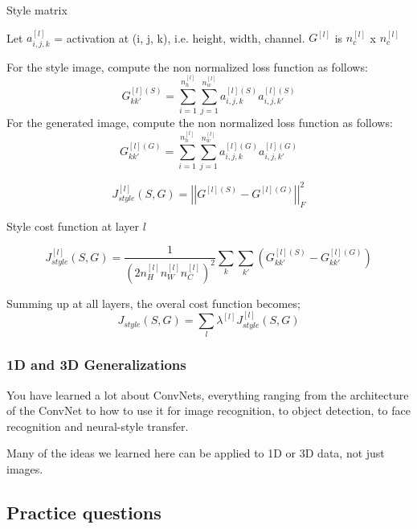 Style matrix

Let $a^{[l]}_{i,j,k}$ = activation at (i, j, k), i.e. height, width, channel. $G^{[l]}$ is $n^{[l]}_{c}$ x $n^{[l]}_{c}$

For the style image, compute the non normalized loss function as follows:
\begin{equation*}
G^{[l](S)}_{kk'} = \sum^{n^{[l]}_h}_{i=1} \sum^{n^{[l]}_{w}}_{j=1} a^{[l](S)}_{i,j,k} a^{[l](S)}_{i,j,k'}
\end{equation*}
For the generated image, compute the non normalized loss function as follows:
\begin{equation*}
G^{[l](G)}_{kk'} = \sum^{n^{[l]}_h}_{i=1} \sum^{n^{[l]}_{w}}_{j=1} a^{[l](G)}_{i,j,k} a^{[l](G)}_{i,j,k'}
\end{equation*}

\begin{equation*}
J^{[l]}_{style} (S, G) = \left|\left| G^{[l](S)} - G^{[l](G)} \right|\right|^2_F
\end{equation*}

Style cost function at layer $l$

\begin{equation*}
J^{[l]}_{style} (S, G) = \frac{1}{(2n^{[l]}_H n^{[l]}_W n^{[l]}_C)^2} \sum_{k} \sum_{k'} (G^{[l](S)}_{kk'} - G^{[l](G)}_{kk'})
\end{equation*}

Summing up at all layers, the overal cost function becomes;
\begin{equation*}
J_{style} (S, G) = \sum_l \lambda^{[l]} J^{[l]}_{style} (S, G)
\end{equation*}

\subsubsection{1D and 3D Generalizations}
You have learned a lot about ConvNets, everything ranging from the architecture of the ConvNet to how to use it for image recognition, to object detection, to face recognition and neural-style transfer. 

Many of the ideas we learned here can be applied to 1D or 3D data, not just images.


\subsection{Practice questions}
